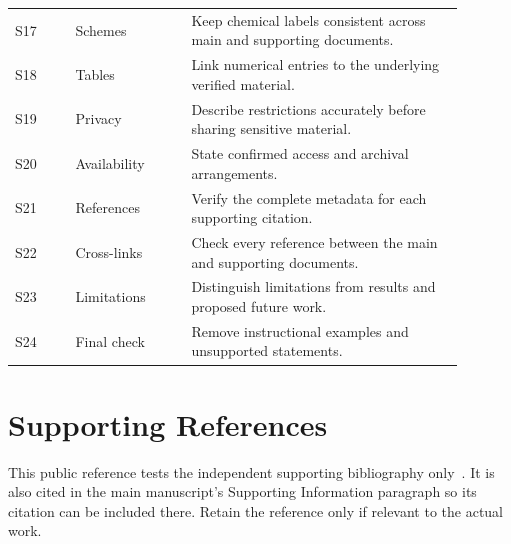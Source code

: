\documentclass[11pt,a4paper]{article}
\begin{document}
\begin{longtable}{@{}p{0.12\linewidth}p{0.23\linewidth}p{0.54\linewidth}@{}}
S17 & Schemes & Keep chemical labels consistent across main and supporting documents.\\
S18 & Tables & Link numerical entries to the underlying verified material.\\
S19 & Privacy & Describe restrictions accurately before sharing sensitive material.\\
S20 & Availability & State confirmed access and archival arrangements.\\
S21 & References & Verify the complete metadata for each supporting citation.\\
S22 & Cross-links & Check every reference between the main and supporting documents.\\
S23 & Limitations & Distinguish limitations from results and proposed future work.\\
S24 & Final check & Remove instructional examples and unsupported statements.\\
\end{longtable}
\normalsize

\section{Supporting References}
This public reference tests the independent supporting bibliography
only~\cite{peng2011reproducible}. It is also cited in the main manuscript's
Supporting Information paragraph so its citation can be included there.
Retain the reference only if relevant to the actual work.


\end{document}
